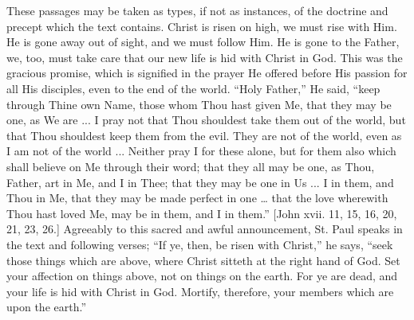 These passages may be taken as types, if not as instances, of the
doctrine and precept which the text contains. Christ is risen on high,
we must rise with Him. He is gone away out of sight, and we must
follow Him. He is gone to the Father, we, too, must take care that our
new life is hid with Christ in God. This was the gracious promise,
which is signified in the prayer He offered before His passion for all
His disciples, even to the end of the world. ``Holy Father,''
He said, ``keep through Thine own Name, those whom Thou hast given
Me, that they may be one, as We are ... I pray not that Thou shouldest
take them out of the world, but that Thou shouldest keep them from the
evil. They are not of the world, even as I am not of the world ...
Neither pray I for these alone, but for them also which shall believe
on Me through their word; that they all may be one, as Thou, Father,
art in Me, and I in Thee; that they may be one in Us ... I in them,
and Thou in Me, that they may be made perfect in one … that the love
wherewith Thou hast loved Me, may be in them, and I in them.''
[John xvii. 11, 15, 16, 20, 21, 23, 26.] Agreeably to this sacred and
awful announcement, St. Paul speaks in the text and following verses;
``If ye, then, be risen with Christ,'' he says, ``seek
those things which are above, where Christ sitteth at the right hand
of God. Set your affection on things above, not on things on the
earth. For ye are dead, and your life is hid with Christ in God.
Mortify, therefore, your members which are upon the earth.''

